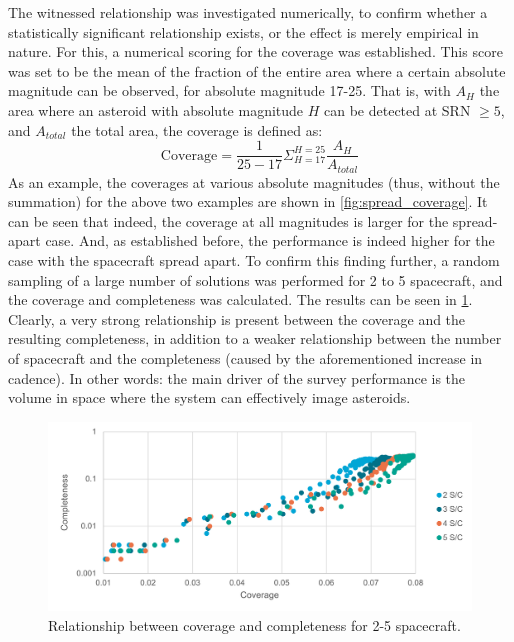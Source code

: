 The witnessed relationship was investigated numerically, to confirm whether a statistically significant relationship exists, or the effect is merely empirical in nature. For this, a numerical scoring for the coverage was established. This score was set to be the mean of the fraction of the entire area where a certain absolute magnitude can be observed, for absolute magnitude 17-25. That is, with $A_{H}$ the area where an asteroid with absolute magnitude $H$ can be detected at SRN $\geq 5$, and $A_{total}$ the total area, the coverage is defined as:
\begin{equation}
 \mathrm{Coverage} = \frac{1}{25-17}\Sigma_{H=17}^{H=25} \frac{A_{H}}{A_{total}}
\end{equation}
As an example, the coverages at various absolute magnitudes (thus, without the summation) for the above two examples are shown in \autoref{fig:spread_coverage}. It can be seen that indeed, the coverage at all magnitudes is larger for the spread-apart case. And, as established before, the performance is indeed higher for the case with the spacecraft spread apart. To confirm this finding further, a random sampling of a large number of solutions was performed for 2 to 5 spacecraft, and the coverage and completeness was calculated. The results can be seen in \ref{fig:coverage_completeness}. Clearly, a very strong relationship is present between the coverage and the resulting completeness, in addition to a weaker relationship between the number of spacecraft and the completeness (caused by the aforementioned increase in cadence). In other words: the main driver of the survey performance is the volume in space where the system can effectively image asteroids. \\

\begin{figure}[htbp]
 \centering
 \includegraphics[width=1.0\textwidth]{img/coverage_completeness.pdf}
 \caption{Relationship between coverage and completeness for 2-5 spacecraft.}
 \label{fig:coverage_completeness}
\end{figure}

